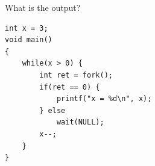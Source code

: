 \begin{slide}

    
    What is the output?
    \medskip
    
    \begin{verbatim}
int x = 3; 
void main() 
{ 
    while(x > 0) { 
        int ret = fork(); 
        if(ret == 0) { 
            printf("x = %d\n", x); 
        } else 
            wait(NULL); 
        x--; 
    } 
}
    \end{verbatim}
    
\end{slide}


